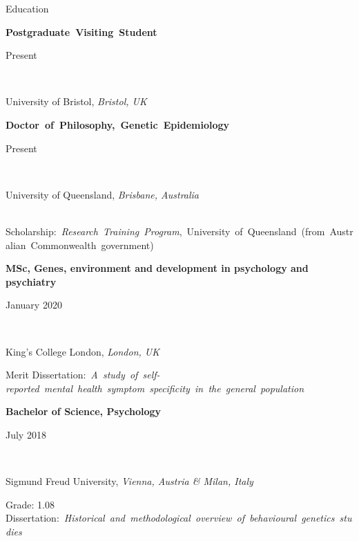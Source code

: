 \documentclass{resume2} %
\newcommand\textbox[1]{%
  \parbox{.48\textwidth}{#1}%
}
\begin{document}
\thispagestyle{plain}



\begin{rSection}{Education}




\textbox{\textbf{\mbox{Postgraduate Visiting Student}}\hfill}\textbox{\hfill Present}\\
\textbox{University of Bristol, \textit{Bristol, UK}}

\textbox{\textbf{\mbox{Doctor of Philosophy, Genetic Epidemiology}}\hfill}\textbox{\hfill Present}\\
\textbox{University of Queensland, \textit{Brisbane, Australia}} \\
\mbox{\small{Scholarship: \textit{Research Training Program}}, University of Queensland (from Australian Commonwealth government)}

\textbox{\textbf{MSc, Genes, environment and development in psychology and psychiatry}\hfill}\textbox{\hfill January 2020}\\
\textbox{King's College London, \textit{London, UK}\hfill}{\hfill Merit}
\mbox{\small{Dissertation: \textit{A study of self-reported mental health symptom specificity in the general population}}}

\textbox{\textbf{Bachelor of Science, Psychology}\hfill}\textbox{\hfill July 2018}\\
\textbox{Sigmund Freud University, \textit{Vienna, Austria \& Milan, Italy}}{\hfill Grade: 1.08}
\mbox{\small{Dissertation: \textit{Historical and methodological overview of behavioural genetics studies}}}


\end{rSection}

\end{document}
